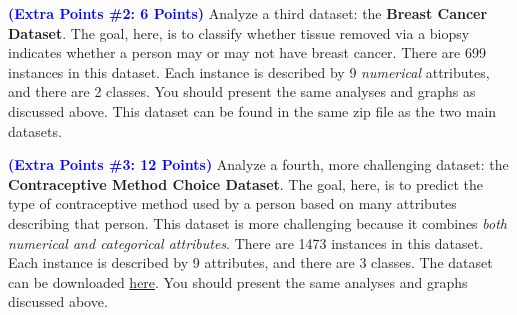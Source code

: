 \documentclass[letterpaper]{article}
\newcommand{\HIGHLIGHT}[1]{\textcolor{blue}{\textbf{#1}}}
\begin{document}
\noindent \HIGHLIGHT{(Extra Points \#2: 6 Points)}
Analyze a third dataset: the \textbf{Breast Cancer Dataset}. The goal, here, is to classify whether tissue removed via a biopsy indicates whether a person may or may not have breast cancer. There are 699 instances in this dataset. Each instance is described by 9 \textit{numerical} attributes, and there are 2 classes. You should present the same analyses and graphs as discussed above. This dataset can be found in the same zip file as the two main datasets.


\noindent \HIGHLIGHT{(Extra Points \#3: 12 Points)}    
Analyze a fourth, more challenging dataset: the \textbf{Contraceptive Method Choice Dataset}. The goal, here, is to predict the type of contraceptive method used by a person based on many attributes describing that person. This dataset is more challenging because it combines \textit{both numerical and categorical attributes}. There are 1473 instances in this dataset. Each instance is described by 9 attributes, and there are 3 classes. The dataset can be downloaded \href{https://archive.ics.uci.edu/ml/datasets/Contraceptive+Method+Choice}{here}. You should present the same analyses and graphs discussed above.
\end{document}
